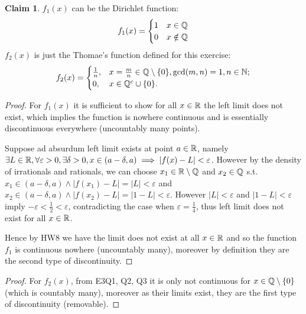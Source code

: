 \documentclass{homework}
\newcommand{\R}{\bb{R}} %
\newcommand{\Q}{\bb{Q}} %
\newcommand{\N}{\bb{N}} %
\newcommand{\?}{\stackrel{?}{=}}
\newcommand{\ep}{\varepsilon}
\theoremstyle{definition}
\newtheorem*{claim}{Claim}
\begin{document}
\begin{claim}
    $f_1(x)$ can be the Dirichlet function: \[
    f_1(x)=\begin{cases}
        1 & x\in\Q \\ 
        0 & x\notin\Q
    \end{cases}
    \]
    $f_2(x)$ is just the Thomae's function defined for this exercise: \[f_2(x)=\begin{cases}
    \frac1n, &x=\frac{m}n\in\Q\setminus\{0\}, \gcd(m,n)=1, n\in\N; \\ 0,& x\in\Q^c\cup\{0\}.
\end{cases}\]

\end{claim}
\begin{proof}
    For $f_1(x)$ it is sufficient to show for all $x\in\R$  the left limit does not exist, which implies the function is nowhere continuous and is essentially discontinuous everywhere (uncountably many points).  

    Suppose ad absurdum left limit exists at point $a\in\R$, namely $\exists L\in\R, \forall\ep>0, \exists\delta>0, x\in(a-\delta,a)\implies |f(x)-L|<\ep$. However by the density of irrationals and rationals, we can choose $x_1\in\R\setminus\Q$ and $x_2\in\Q$ s.t. $x_1\in(a-\delta,a)\land |f(x_1)-L|=|L|<\ep$ and $x_2\in(a-\delta,a)\land|f(x_2)-L|=|1-L|<\ep$. However $|L|<\ep$ and $|1-L|<\ep$ imply $-\ep<\frac12<\ep$, contradicting the case when $\ep=\frac14$, thus left limit does not exist for all $x\in\R$. 

    Hence by HW8 we have the limit does not exist at all $x\in\R$ and so the function $f_1$ is continuous nowhere (uncountably many), moreover by definition they are the second type of discontinuity. 
    
\end{proof}
\begin{proof}
    For $f_2(x)$, from E3Q1, Q2, Q3 it is only not continuous for $x\in\Q\setminus\{0\}$ (which is countably many), moreover as their limits exist, they are the first type of discontinuity (removable). 
\end{proof}
\end{document}
